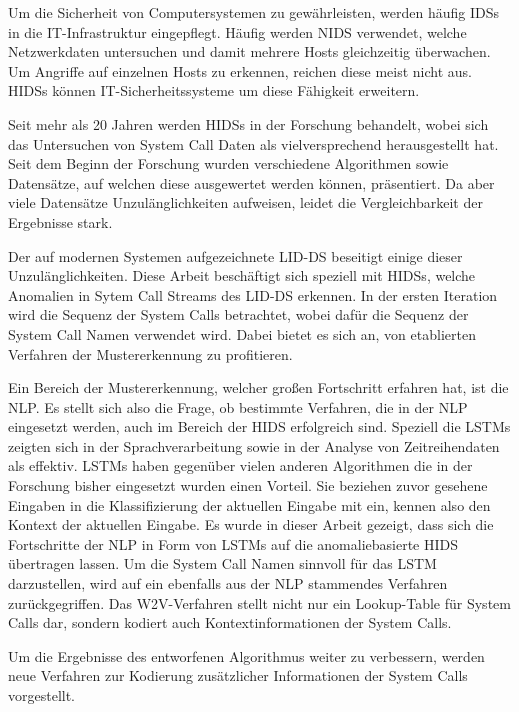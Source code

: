 Um die Sicherheit von Computersystemen zu gewährleisten, werden häufig \acp{IDS} in die IT-Infrastruktur eingepflegt.
Häufig werden \ac{NIDS} verwendet, welche Netzwerkdaten untersuchen und damit mehrere Hosts gleichzeitig überwachen.
Um Angriffe auf einzelnen Hosts zu erkennen, reichen diese meist nicht aus.
\acp{HIDS} können IT-Sicherheitssysteme um diese Fähigkeit erweitern.\par\medskip
Seit mehr als 20 Jahren werden \acp{HIDS} in der Forschung behandelt, wobei sich das Untersuchen von System Call Daten als vielversprechend herausgestellt hat.
Seit dem Beginn der Forschung wurden verschiedene Algorithmen sowie Datensätze, auf welchen diese ausgewertet werden können, präsentiert.
Da aber viele Datensätze Unzulänglichkeiten aufweisen, leidet die Vergleichbarkeit der Ergebnisse stark.\par\medskip
Der auf modernen Systemen aufgezeichnete \ac{LID-DS} beseitigt einige dieser Unzulänglichkeiten.
Diese Arbeit beschäftigt sich speziell mit \acp{HIDS}, welche Anomalien in Sytem Call Streams des \ac{LID-DS} erkennen. 
In der  ersten Iteration wird die Sequenz der System Calls betrachtet, wobei dafür die Sequenz der System Call Namen verwendet wird.
Dabei bietet es sich an, von etablierten Verfahren der Mustererkennung zu profitieren.\par\medskip
Ein Bereich der Mustererkennung, welcher großen Fortschritt erfahren hat, ist die \ac{NLP}.
Es stellt sich also die Frage, ob bestimmte Verfahren, die in der \ac{NLP} eingesetzt werden, auch im Bereich der \ac{HIDS} erfolgreich sind.
Speziell die \acp{LSTM} zeigten sich in der Sprachverarbeitung sowie in der Analyse von Zeitreihendaten als effektiv.
\acp{LSTM} haben gegenüber vielen anderen Algorithmen die in der Forschung bisher eingesetzt wurden einen Vorteil.
Sie beziehen zuvor gesehene Eingaben in die Klassifizierung der aktuellen Eingabe mit ein, kennen also den Kontext der aktuellen Eingabe.
Es wurde in dieser Arbeit gezeigt, dass sich die Fortschritte der \ac{NLP} in Form von \acp{LSTM} auf die anomaliebasierte \ac{HIDS} übertragen lassen.
Um die System Call Namen sinnvoll für das \ac{LSTM} darzustellen, wird auf ein ebenfalls aus der \ac{NLP} stammendes Verfahren zurückgegriffen.
Das \ac{W2V}-Verfahren stellt nicht nur ein Lookup-Table für System Calls dar, sondern kodiert auch Kontextinformationen der System Calls.\par\medskip
Um die Ergebnisse des entworfenen Algorithmus weiter zu verbessern, werden neue Verfahren zur Kodierung zusätzlicher Informationen der System Calls vorgestellt.
